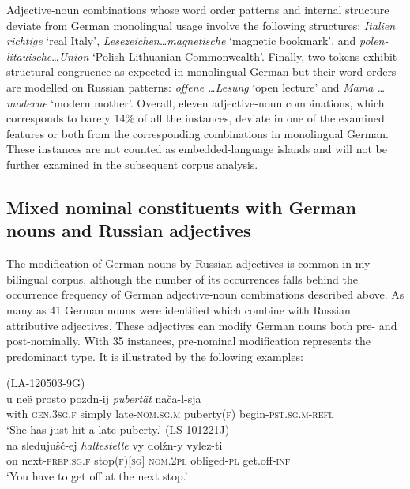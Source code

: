 \begin{sloppypar}
Adjective-noun combinations whose word order patterns and internal structure deviate from German monolingual usage involve the following structures: \textit{Italien richtige} `real Italy', \textit{Lesezeichen\dots magnetische} `magnetic bookmark', and \textit{polen-litauische}\dots \textit{Union} `Polish-Lithuanian Commonwealth'. Finally, two tokens exhibit structural congruence as expected in monolingual German but their word-orders are modelled on Russian patterns: \textit{offene \dots Lesung} `open lecture' and \textit{Mama \dots moderne} `modern mother'. Overall, eleven adjective-noun combinations, which corresponds to barely 14\% of all the instances, deviate in one of the examined features or both from the corresponding combinations in monolingual German. These instances are not counted as embedded-language islands and will not be further examined in the subsequent corpus analysis. 
\end{sloppypar}

\subsection{Mixed nominal constituents with German nouns and Russian adjectives}

The modification of German nouns by Russian adjectives is common in my bilingual corpus, although the number of its occurrences falls behind the occurrence frequency of German adjective-noun combinations described above. As many as 41 German nouns were identified which combine with Russian attributive adjectives. These adjectives can modify German nouns both pre- and post-nominally. With 35 instances, pre-nominal modification represents the predominant type. It is illustrated by the following examples:

\ea 
\label{ex:4:37}
(LA-120503-9G)\\
    \gll u neë prosto pozdn-ij \textit{pubertät}  nača-l-sja\\
    with	\textsc{gen.3sg.f} 	simply late-\textsc{nom.sg.m}  puberty(\textsc{f})  begin-\textsc{pst.sg.m-refl}\\
\glt `She has just hit a late puberty.'
\ex 
\label{ex:4:38}
(LS-101221J)\\
    \gll na sledujušč-ej \textit{haltestelle}  vy dolžn-y vylez-ti\\
    on	next-\textsc{prep.sg.f} 	stop\textsc{(f)[sg]}	 \textsc{nom.2pl} 	obliged-\textsc{pl} get.off-\textsc{inf}\\
\glt `You have to get off at the next stop.'
\z

